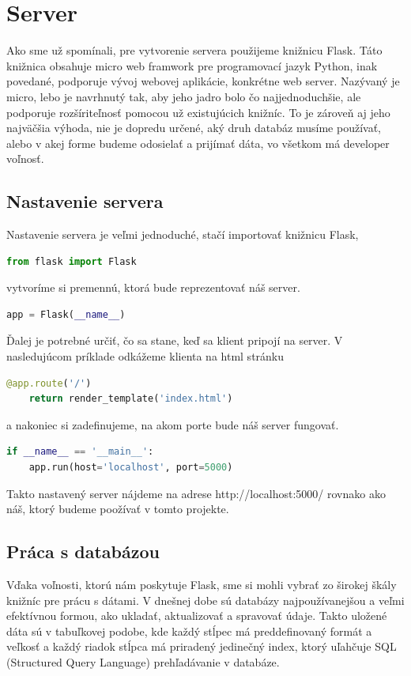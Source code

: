 \section{Server}
Ako sme už spomínali, pre vytvorenie servera použijeme knižnicu Flask. Táto knižnica obsahuje micro web framwork pre programovací jazyk Python, inak povedané, podporuje vývoj webovej aplikácie, konkrétne web server. Nazývaný je micro, lebo je navrhnutý tak, aby jeho jadro bolo čo najjednoduchšie, ale podporuje rozšíriteľnosť pomocou už existujúcich knižníc. To je zároveň aj jeho najväčšia výhoda, nie je dopredu určené, aký druh databáz musíme používať, alebo v akej forme budeme odosielať a prijímať dáta, vo všetkom má developer voľnosť.
\subsection{Nastavenie servera}
Nastavenie servera je veľmi jednoduché, stačí importovať knižnicu Flask,
\begin{lstlisting}[language=Python]
from flask import Flask
\end{lstlisting}\noindent
vytvoríme si premennú, ktorá bude reprezentovať náš server.
\begin{lstlisting}[language=Python]
app = Flask(__name__)
\end{lstlisting}\noindent
Ďalej je potrebné určiť, čo sa stane, keď sa klient pripojí na server. V nasledujúcom príklade odkážeme klienta na html stránku
\begin{lstlisting}[language=Python]
@app.route('/')
	return render_template('index.html')
\end{lstlisting}\noindent
a nakoniec si zadefinujeme, na akom porte bude náš server fungovať.
\begin{lstlisting}[language=Python]
if __name__ == '__main__':
	app.run(host='localhost', port=5000)
\end{lstlisting}
Takto nastavený server nájdeme na adrese http://localhost:5000/ rovnako ako náš, ktorý budeme poožívať v tomto projekte\cite{bib4}.

\subsection{Práca s databázou}
Vďaka voľnosti, ktorú nám poskytuje Flask, sme si mohli vybrať zo širokej škály knižníc pre prácu s dátami. V dnešnej dobe sú databázy najpoužívanejšou a veľmi efektívnou formou, ako ukladať, aktualizovať a spravovať údaje. Takto uložené dáta sú v tabuľkovej podobe, kde každý stĺpec má preddefinovaný formát a veľkosť a každý riadok stĺpca má priradený jedinečný index, ktorý uľahčuje SQL (Structured Query Language) prehľadávanie v databáze.

